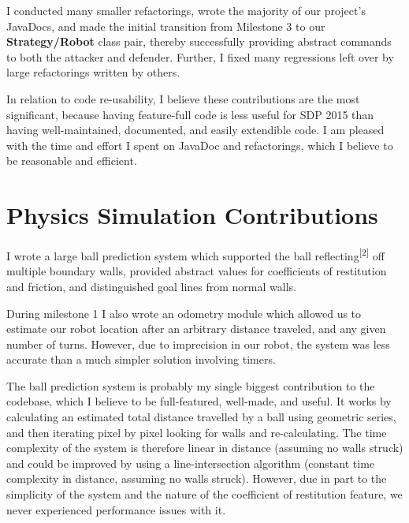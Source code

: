 \documentclass[a4paper,11pt]{article}
\begin{document}
I conducted many smaller refactorings, wrote the majority of our project's JavaDocs, and made the initial transition from Milestone 3 to our \textbf{Strategy/Robot} class pair, thereby successfully providing abstract commands to both the attacker and defender. Further, I fixed many regressions left over by large refactorings written by others.

In relation to code re-usability, I believe these contributions are the most significant, because having feature-full code is less useful for SDP 2015 than having well-maintained, documented, and easily extendible code. I am pleased with the time and effort I spent on JavaDoc and refactorings, which I believe to be reasonable and efficient.


\section{Physics Simulation Contributions}

I wrote a large ball prediction system which supported the ball reflecting\textsuperscript{[2]} off multiple boundary walls, provided abstract values for coefficients of restitution and friction, and distinguished goal lines from normal walls.

During milestone 1 I also wrote an odometry module which allowed us to estimate our robot location after an arbitrary distance traveled, and any given number of turns. However, due to imprecision in our robot, the system was less accurate than a much simpler solution involving timers.

The ball prediction system is probably my single biggest contribution to the codebase, which I believe to be full-featured, well-made, and useful. It works by calculating an estimated total distance travelled by a ball using geometric series, and then iterating pixel by pixel looking for walls and re-calculating. The time complexity of the system is therefore linear in distance (assuming no walls struck) and could be improved by using a line-intersection algorithm (constant time complexity in distance, assuming no walls struck). However, due in part to the simplicity of the system and the nature of the coefficient of restitution feature, we never experienced performance issues with it.
\end{document}
